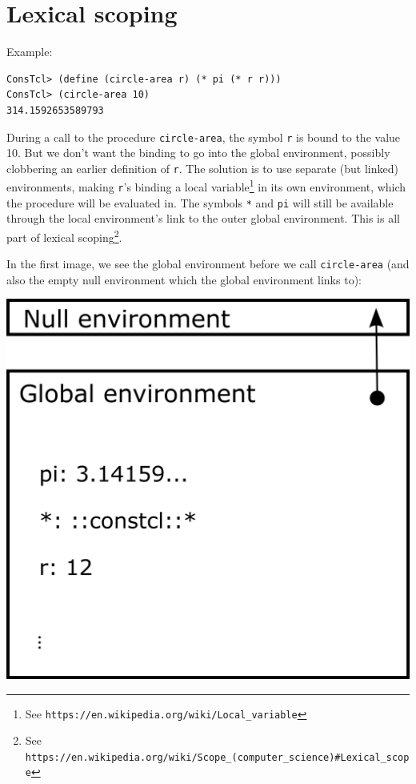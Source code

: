 \documentclass[twoside]{report}
\begin{document}
\section{Lexical scoping}
\label{lexical-scoping}

Example:

\begin{verbatim}
ConsTcl> (define (circle-area r) (* pi (* r r)))
ConsTcl> (circle-area 10)
314.1592653589793
\end{verbatim}

During a call to the procedure \texttt{circle-area}, the symbol \texttt{r} is bound to the value 10. But we don't want the binding to go into the global environment, possibly clobbering an earlier definition of \texttt{r}. The solution is to use separate (but linked) environments, making \texttt{r}'s binding a local variable\footnote{See \texttt{https://en.wikipedia.org/wiki/Local\_variable}} in its own environment, which the procedure will be evaluated in. The symbols \texttt{*} and \texttt{pi} will still be available through the local environment's link to the outer global environment. This is all part of lexical scoping\footnote{See \texttt{https://en.wikipedia.org/wiki/Scope\_(computer\_science)\#Lexical\_scope}}.

In the first image, we see the global environment before we call \texttt{circle-area} (and also the empty null environment which the global environment links to):

\includegraphics{images/env1.png}
\end{document}
